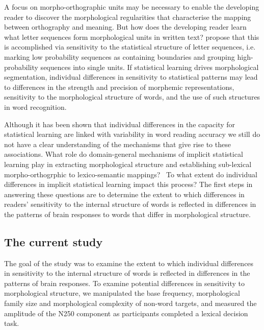 \documentclass[review]{elsarticle}
\begin{document}
A focus on morpho-orthographic units may be necessary to enable the developing reader to discover the morphological regularities that characterise the mapping between orthography and meaning.  But how does the developing reader learn what letter sequences form morphological units in written text?  {\renewcommand\&{and}\citet{rastleMorphologicalDecompositionBased2008}} propose that this is accomplished via sensitivity to the statistical structure of letter sequences, i.e. marking low probability sequences as containing boundaries and  grouping high- probability sequences into single units. If statistical learning drives morphological segmentation, individual differences in sensitivity to statistical patterns may lead to differences in the strength and precision of morphemic representations,  sensitivity to the morphological structure of words,  and the use of such structures in word recognition. 

Although it has been shown that individual differences in the capacity for statistical learning are linked with variability in word reading accuracy \citep{arciuliReadingStatisticalLearning2018, arciuliStatisticalLearningRelated2012} we still do not have a clear understanding of the mechanisms that give rise to these associations. What role do domain-general mechanisms of implicit statistical learning play in extracting morphological structure and establishing sub-lexical morpho-orthogrphic to lexico-semantic mappings?  To what extent do individual differences in implicit statistical learning impact this process? The first steps in answering these questions are to determine the extent to which differences in readers’ sensitivity to the internal structure of words is reflected in differences in the patterns of brain responses to words that differ in morphological structure. 

\subsection{The current study}

The goal of the study was to examine the extent to which  individual differences in sensitivity to the internal structure of words is reflected in differences in the patterns of brain responses. To examine potential differences in sensitivity to morphological structure, we manipulated the base frequency, morphological family size and morphological complexity of non-word targets, and measured the amplitude of the N250 component as participants completed a lexical decision task.  
\end{document}
